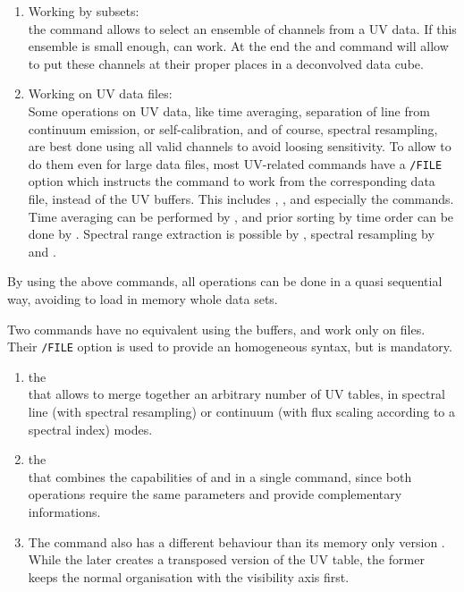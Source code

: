 \begin{enumerate}
\item Working by subsets:\\
  the  command allows to select an ensemble of 
  channels from a UV data. If this ensemble is small enough, \imager{} 
  can work.  At the end the  and 
   command will allow to put these channels at 
  their proper places in a deconvolved data cube.
\item Working on UV data files:\\
  Some operations on UV data, like time averaging, separation of line 
  from continuum emission, or self-calibration, and of course, spectral 
  resampling, are best done using all valid channels to avoid loosing 
  sensitivity. 
  To allow \imager{} to do them even for large data
  files, most UV-related commands have a \texttt{/FILE} option which
  instructs the command to work from the corresponding data file,
  instead of the UV buffers. This includes , 
  ,  and especially 
  the  commands. Time averaging can be performed 
  by , and prior sorting by time order can be
  done by . Spectral range extraction is possible by 
  , spectral resampling by 
    and .
\end{enumerate}
By using the above commands, all operations can be done in a
quasi sequential way, avoiding to load in memory whole data sets.

Two commands have no equivalent using the \imager{} buffers, and work
only on files. Their \texttt{/FILE} option is used to provide an
homogeneous syntax, but is  mandatory.
\begin{enumerate}
\item the \\
that allows to merge together an arbitrary number of UV tables,
in spectral line (with spectral resampling) or continuum (with 
flux scaling according to a spectral index) modes.
\item the \\
that combines the capabilities of  and 
 in a single command, since both operations require 
the same parameters and provide complementary informations.
\item The  command also has a different behaviour than
its memory only version . While the later creates
a transposed version of the UV table, the former keeps the normal
organisation with the visibility axis first. 
\end{enumerate}

